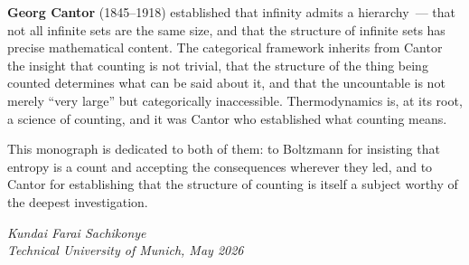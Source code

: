 \textbf{Georg Cantor} (1845--1918) established that infinity admits a hierarchy~---
that not all infinite sets are the same size, and that the structure of infinite sets
has precise mathematical content. The categorical framework inherits from Cantor
the insight that counting is not trivial, that the structure of the thing being counted
determines what can be said about it, and that the uncountable is not merely
``very large'' but categorically inaccessible. Thermodynamics is, at its root,
a science of counting, and it was Cantor who established what counting means.

This monograph is dedicated to both of them: to Boltzmann for insisting that
entropy is a count and accepting the consequences wherever they led,
and to Cantor for establishing that the structure of counting is itself
a subject worthy of the deepest investigation.

\bigskip
\noindent\textit{Kundai Farai Sachikonye}\\
\textit{Technical University of Munich, May 2026}
